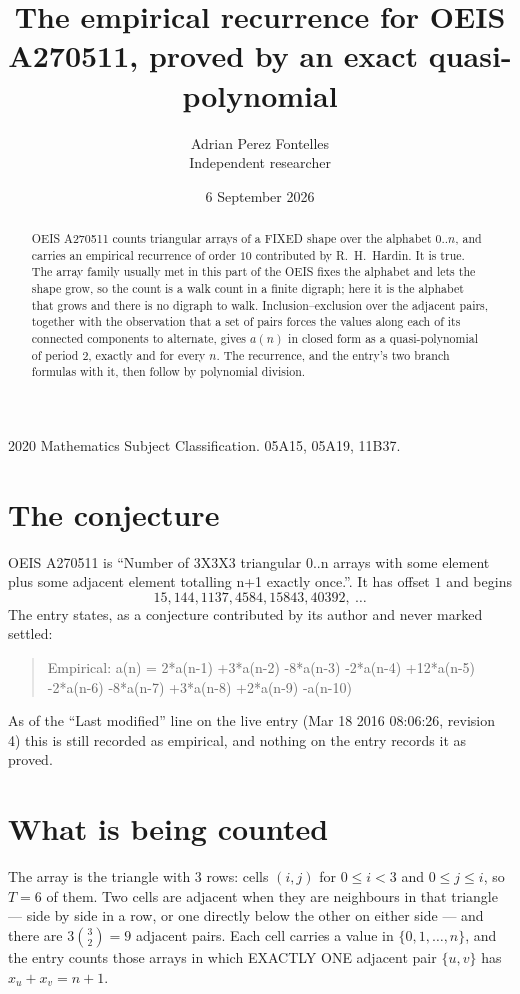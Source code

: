 \documentclass[11pt,a4paper]{article}
\title{The empirical recurrence for OEIS A270511, proved by an exact quasi-polynomial}
\author{Adrian Perez Fontelles\\ \small Independent researcher}
\date{6 September 2026}
\theoremstyle{plain}
\theoremstyle{definition}
\begin{document}
\maketitle

\begin{abstract}
OEIS A270511 counts triangular arrays of a FIXED shape over the alphabet $0..n$, and carries an
empirical recurrence of order $10$ contributed by R.~H.~Hardin. It is true. The array
family usually met in this part of the OEIS fixes the alphabet and lets the shape grow, so the
count is a walk count in a finite digraph; here it is the alphabet that grows and there is no
digraph to walk. Inclusion--exclusion over the adjacent pairs, together with the observation
that a set of pairs forces the values along each of its connected components to alternate,
gives $a(n)$ in closed form as a quasi-polynomial of period $2$, exactly and for every $n$.
The recurrence, and the entry's two branch formulas with it, then follow by polynomial
division.
\end{abstract}

\noindent\small 2020 Mathematics Subject Classification. 05A15, 05A19, 11B37.\normalsize

\section{The conjecture}

OEIS A270511 is ``Number of 3X3X3 triangular 0..n arrays with some element plus some adjacent element totalling n+1 exactly once.''. It has offset $1$ and begins
\[
15, 144, 1137, 4584, 15843, 40392,\ \dots
\]
The entry states, as a conjecture contributed by its author and never marked settled:
\begin{quote}
Empirical: a(n) = 2*a(n-1) +3*a(n-2) -8*a(n-3) -2*a(n-4) +12*a(n-5) -2*a(n-6) -8*a(n-7) +3*a(n-8) +2*a(n-9) -a(n-10)
\end{quote}
As of the ``Last modified'' line on the live entry (Mar 18 2016 08:06:26, revision 4) this is still
recorded as empirical, and nothing on the entry records it as proved.

\section{What is being counted}

The array is the triangle with $3$ rows: cells $(i,j)$ for $0\le i<3$ and $0\le j\le i$,
so $T=6$ of them. Two cells are adjacent when they are neighbours in that triangle --- side
by side in a row, or one directly below the other on either side --- and there are
$3\binom{3}{2}=9$ adjacent pairs. Each cell carries a value in
$\{0,1,\dots,n\}$, and the entry counts those arrays in which EXACTLY ONE adjacent pair
$\{u,v\}$ has $x_u+x_v=n+1$.
\end{document}
